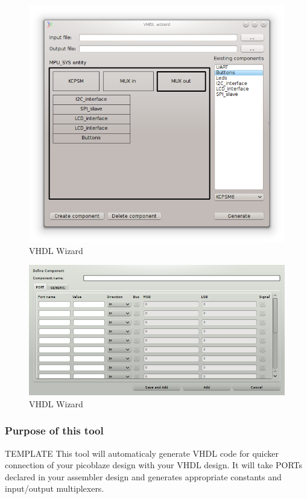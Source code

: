 \begin{figure}[h]
    \centering
    \includegraphics[width=.5\textwidth]{img/VHDL_wizard.png}
    \caption{VHDL Wizard}
\end{figure}

\begin{figure}[h]
    \centering
    \includegraphics[width=.5\textwidth]{img/VHDL_create_component.png}
    \caption{VHDL Wizard}
\end{figure}

\subsubsection{Purpose of this tool}
    TEMPLATE
    This tool will automaticaly generate VHDL code for quicker connection of your picoblaze design with your VHDL design. It will take
    PORTs declared in your assembler design and generates appropriate constants and input/output multiplexers.


